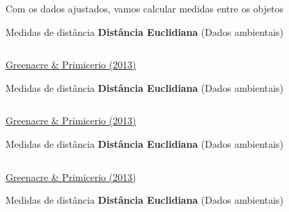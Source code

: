 \documentclass[
  ignorenonframetext,
]{beamer}
\begin{document}
\begin{frame}{Com os dados ajustados, vamos calcular medidas entre os
objetos}
\begin{block}{Medidas de distância}
\protect\hypertarget{medidas-de-distuxe2ncia}{}
\textbf{Distância Euclidiana} (Dados ambientais)

\begin{columns}[T]
\begin{column}{0.35\textwidth}
\end{column}

\begin{column}{0.65\textwidth}
\end{column}
\end{columns}

\href{https://www.fbbva.es/microsite/multivariate-statistics/}{Greenacre
\& Primicerio (2013)}
\end{block}

\begin{block}{Medidas de distância}
\protect\hypertarget{medidas-de-distuxe2ncia-1}{}
\textbf{Distância Euclidiana} (Dados ambientais)

\begin{columns}[T]
\begin{column}{0.35\textwidth}
\end{column}

\begin{column}{0.65\textwidth}
\end{column}
\end{columns}

\href{https://www.fbbva.es/microsite/multivariate-statistics/}{Greenacre
\& Primicerio (2013)}
\end{block}

\begin{block}{Medidas de distância}
\protect\hypertarget{medidas-de-distuxe2ncia-2}{}
\textbf{Distância Euclidiana} (Dados ambientais)

\begin{columns}[T]
\begin{column}{0.35\textwidth}
\end{column}

\begin{column}{0.65\textwidth}
\end{column}
\end{columns}

\href{https://www.fbbva.es/microsite/multivariate-statistics/}{Greenacre
\& Primicerio (2013)}
\end{block}

\begin{block}{Medidas de distância}
\protect\hypertarget{medidas-de-distuxe2ncia-3}{}
\textbf{Distância Euclidiana} (Dados ambientais)


\end{block}
\end{frame}
\end{document}
